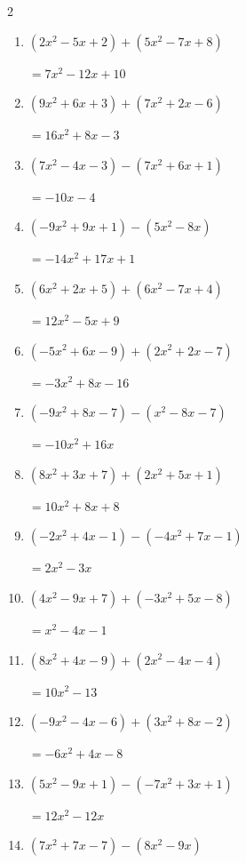 \begin{multicols}{2}
\begin{enumerate}
        $=14x+7$

  \item $(2x^{2}-5x+2)+(5x^{2}-7x+8)$

        $=7x^{2}-12x+10$

  \item $(9x^{2}+6x+3)+(7x^{2}+2x-6)$

        $=16x^{2}+8x-3$

  \item $(7x^{2}-4x-3)-(7x^{2}+6x+1)$

        $=-10x-4$

  \item $(-9x^{2}+9x+1)-(5x^{2}-8x)$

        $=-14x^{2}+17x+1$

  \item $(6x^{2}+2x+5)+(6x^{2}-7x+4)$

        $=12x^{2}-5x+9$

  \item $(-5x^{2}+6x-9)+(2x^{2}+2x-7)$

        $=-3x^{2}+8x-16$

  \item $(-9x^{2}+8x-7)-(x^{2}-8x-7)$

        $=-10x^{2}+16x$

  \item $(8x^{2}+3x+7)+(2x^{2}+5x+1)$

        $=10x^{2}+8x+8$

  \item $(-2x^{2}+4x-1)-(-4x^{2}+7x-1)$

        $=2x^{2}-3x$

  \item $(4x^{2}-9x+7)+(-3x^{2}+5x-8)$

        $=x^{2}-4x-1$

  \item $(8x^{2}+4x-9)+(2x^{2}-4x-4)$

        $=10x^{2}-13$

\columnbreak %

  \item $(-9x^{2}-4x-6)+(3x^{2}+8x-2)$

        $=-6x^{2}+4x-8$

  \item $(5x^{2}-9x+1)-(-7x^{2}+3x+1)$

        $=12x^{2}-12x$

  \item $(7x^{2}+7x-7)-(8x^{2}-9x)$


\end{enumerate}
\end{multicols}
